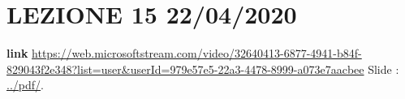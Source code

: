 \section*{LEZIONE 15 22/04/2020}
\textbf{link} \url{https://web.microsoftstream.com/video/32640413-6877-4941-b84f-829043f2e348?list=user&userId=979e57e5-22a3-4478-8999-a073e7aacbee}\newline
\newline
Slide : \url{../pdf/}.